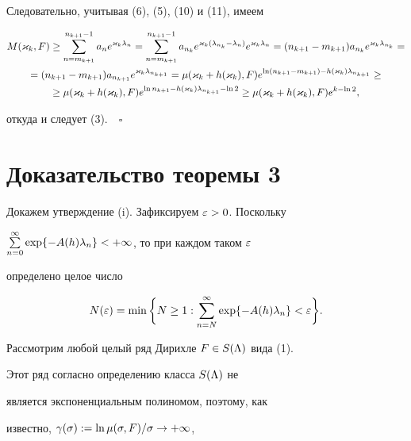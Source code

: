 Следовательно, учитывая (6), (5), (10) и (11), имеем


\begin{gather*}


M(\k_k,F)\ge


\sum_{n=m_{k+1}}^{n_{k+1}-1}a_ne^{\k_k\l_n}=


\sum_{n=m_{k+1}}^{n_{k+1}-1}a_{n_k}e^{\k_k(\l_{n_k}-\l_n)}e^{\k_k\l_n}=


(n_{k+1}-m_{k+1})


a_{n_k}e^{\k_k\l_{n_k}}=\\


=(n_{k+1}-m_{k+1})


a_{n_{k+1}}e^{\k_k\l_{n_{k+1}}}= 


\mu(\k_k+h(\k_k),F)e^{\ln(n_{k+1}-m_{k+1})-h(\k_k)\l_{n_{k+1}}}\ge\\


\ge


\mu(\k_k+h(\k_k),F)e^{\ln n_{k+1}-h(\k_k)\l_{n_{k+1}}-\ln 2}\ge


\mu(\k_k+h(\k_k),F)e^{k-\ln 2},


\end{gather*}


откуда и следует (3).$\quad\square$








\section{Доказательство теоремы 3}





Докажем утверждение (i). Зафиксируем $\varepsilon>0$. Поскольку 


$\sum\limits_{n=0}^\infty\exp\{-A(h)\lambda_n\}<+\infty$, то при каждом таком $\varepsilon$


определено целое число 


$$


N(\e)=\min\bigg\{N\ge 1:\sum_{n=N}^\i\exp\{-A(h)\l_n\}<\e\bigg\}.


$$





Рассмотрим любой целый ряд Дирихле $F\in S(\Lambda)$ вида (1).


Этот ряд согласно определению класса $S(\Lambda)$ не


является экспоненциальным полиномом, поэтому, как 


известно, $\gamma(\sigma):=\ln\mu(\sigma,F)/\sigma\to+\infty$, 


